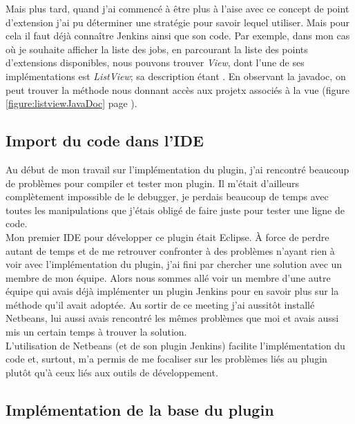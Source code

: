 Mais plus tard, quand j'ai commencé à être plus à l'aise avec ce concept de point d'extension j'ai pu déterminer une stratégie pour savoir lequel utiliser. Mais pour cela il faut déjà conna\^{i}tre Jenkins ainsi que son code. Par exemple, dans mon cas où je souhaite afficher la liste des jobs, en parcourant la liste des points d'extensions disponibles, nous pouvons trouver \emph{View}, dont l'une de ses implémentations est \emph{ListView}; sa description étant . En observant la javadoc, on peut trouver la méthode nous donnant accès aux projetx associés à la vue (figure \ref{figure:listviewJavaDoc} page \pageref{figure:listviewJavaDoc}).


\subsection{Import du code dans l'IDE}
Au début de mon travail sur l'implémentation du plugin, j'ai rencontré beaucoup de problèmes pour compiler et tester mon plugin. Il m'était d'ailleurs complètement impossible de le debugger, je perdais beaucoup de temps avec toutes les manipulations que j'étais obligé de faire juste pour tester une ligne de code.\\
Mon premier IDE pour développer ce plugin était \gls{Eclipse}. \`{A} force de perdre autant de temps et de me retrouver confronter à des problèmes n'ayant rien à voir avec l'implémentation du plugin, j'ai fini par chercher une solution avec un membre de mon équipe. Alors nous sommes allé voir un membre d'une autre équipe qui avais déjà implémenter un plugin Jenkins pour en savoir plus sur la méthode qu'il avait adoptée. Au sortir de ce meeting j'ai aussitôt installé \gls{Netbeans}, lui aussi avais rencontré les mêmes problèmes que moi et avais aussi mis un certain temps à trouver la solution.\\

L'utilisation de Netbeans (et de son plugin Jenkins) facilite l'implémentation du code et, surtout, m'a permis de me focaliser sur les problèmes liés au plugin plutôt qu'à ceux liés aux outils de développement.\\


\subsection{Implémentation de la base du plugin}

